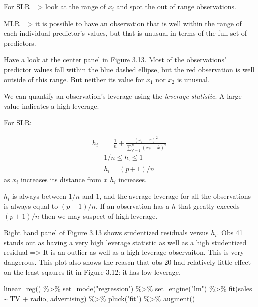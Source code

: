 \documentclass[
  letterpaper,
  DIV=11,
  numbers=noendperiod]{scrreprt}
\newenvironment{Shaded}{\begin{snugshade}}{\end{snugshade}}
\newcommand{\FunctionTok}[1]{\textcolor[rgb]{0.02,0.16,0.49}{#1}}
\newcommand{\NormalTok}[1]{\textcolor[rgb]{0.33,0.33,0.33}{#1}}
\newcommand{\SpecialCharTok}[1]{\textcolor[rgb]{0.00,0.46,0.62}{#1}}
\newcommand{\StringTok}[1]{\textcolor[rgb]{0.00,0.50,0.00}{#1}}
\begin{document}
For SLR =\textgreater{} look at the range of \(x_i\) and spot the out of
range observations.

MLR =\textgreater{} it is possible to have an observation that is well
within the range of each individual predictor's values, but that is
unusual in terms of the full set of predictors.

Have a look at the center panel in Figure 3.13. Most of the
observations' predictor values fall within the blue dashed ellipse, but
the red observation is well outside of this range. But neither its value
for \(x_1\) nor \(x_2\) is unusual.

We can quantify an observation's leverage using the \emph{leverage
statistic}. A large value indicates a high leverage.

For SLR:

\[
\begin{align}
h_i &= \frac{1}{n} + \frac{(x_i - \bar{x})^2}{\sum_{i'=1}^n(x_{i'} - \bar{x})^2} \\
&1/n \leq h_i \leq 1 \\
&\bar{h_i} = (p+1)/n
\end{align}
\] as \(x_i\) increases its distance from \(\bar{x}\) \(h_i\) increases.

\(h_i\) is always between \(1/n\) and \(1\), and the average leverage
for all the observations is always equal to \((p+1)/n\). If an
observation has a \(h\) that greatly exceeds \((p+1)/n\) then we may
suspect of high leverage.

Right hand panel of Figure 3.13 shows studentized residuals versus
\(h_i\). Obs 41 stands out as having a very high leverage statistic as
well as a high studentized residual =\textgreater{} It is an outlier as
well as a high leverage observaiton. This is very dangerous. This plot
also shows the reason that obs 20 had relatively little effect on the
least sqaures fit in Figure 3.12: it has low leverage.

\begin{Shaded}
\begin{Highlighting}[]
\FunctionTok{linear\_reg}\NormalTok{() }\SpecialCharTok{\%\textgreater{}\%} 
  \FunctionTok{set\_mode}\NormalTok{(}\StringTok{"regression"}\NormalTok{) }\SpecialCharTok{\%\textgreater{}\%} 
  \FunctionTok{set\_engine}\NormalTok{(}\StringTok{"lm"}\NormalTok{) }\SpecialCharTok{\%\textgreater{}\%} 
  \FunctionTok{fit}\NormalTok{(sales }\SpecialCharTok{\textasciitilde{}}\NormalTok{ TV }\SpecialCharTok{+}\NormalTok{ radio, advertising) }\SpecialCharTok{\%\textgreater{}\%} 
  \FunctionTok{pluck}\NormalTok{(}\StringTok{"fit"}\NormalTok{) }\SpecialCharTok{\%\textgreater{}\%} 
  \FunctionTok{augment}\NormalTok{()}
\end{Highlighting}
\end{Shaded}
\end{document}
